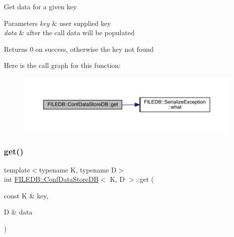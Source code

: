 Get data for a given key 
\begin{DoxyParams}{Parameters}
{\em key} & user supplied key \\
\hline
{\em data} & after the call data will be populated \\
\hline
\end{DoxyParams}
\begin{DoxyReturn}{Returns}
0 on success, otherwise the key not found 
\end{DoxyReturn}
Here is the call graph for this function\+:
\nopagebreak
\begin{figure}[H]
\begin{center}
\leavevmode
\includegraphics[width=350pt]{d8/d19/classFILEDB_1_1ConfDataStoreDB_ad89d0c1aef7c82fb0273d50bfea7cf0a_cgraph}
\end{center}
\end{figure}
\mbox{\label{classFILEDB_1_1ConfDataStoreDB_ad89d0c1aef7c82fb0273d50bfea7cf0a}} 
\subsubsection{\texorpdfstring{get()}{get()}\hspace{0.1cm}{\footnotesize\ttfamily [2/3]}}
{\footnotesize\ttfamily template$<$typename K, typename D$>$ \\
int \mbox{\hyperlink{classFILEDB_1_1ConfDataStoreDB}{F\+I\+L\+E\+D\+B\+::\+Conf\+Data\+Store\+DB}}$<$ K, D $>$\+::get (\begin{DoxyParamCaption}\item[{const K \&}]{key,  }\item[{D \&}]{data }\end{DoxyParamCaption})\hspace{0.3cm}{\ttfamily [inline]}}

